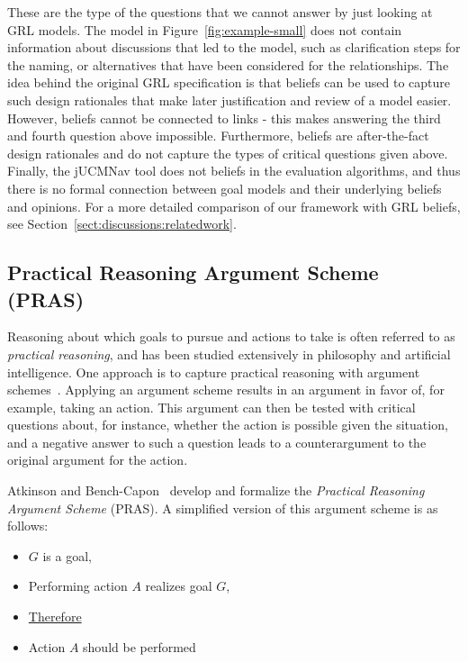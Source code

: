 These are the type of the questions that we cannot answer by just looking at GRL models. The model in Figure~\ref{fig:example-small} does not contain information about discussions that led to the model, such as clarification steps for the naming, or alternatives that have been considered for the relationships. The idea behind the original GRL specification is that beliefs can be used to capture such design rationales that make later justification and review of a model easier. However, beliefs cannot be connected to links - this makes answering the third and fourth question above impossible. Furthermore, beliefs are after-the-fact design rationales and do not capture the types of critical questions given above. Finally, the jUCMNav tool does not beliefs in the evaluation algorithms, and thus there is no formal connection between goal models and their underlying beliefs and opinions. For a more detailed comparison of our framework with GRL beliefs, see Section~\ref{sect:discussions:relatedwork}. 

\subsection{Practical Reasoning Argument Scheme (PRAS)}
\label{sect:background:pras}

Reasoning about which goals to pursue and actions to take is often referred to as \emph{practical reasoning}, and has been studied extensively in philosophy and artificial intelligence. One approach is to capture practical reasoning with argument schemes~\cite{walton1990}. Applying an argument scheme results in an argument in favor of, for example, taking an action. This argument can then be tested with critical questions about, for instance, whether the action is possible given the situation, and a negative answer to such a question leads to a counterargument to the original argument for the action. 

Atkinson and Bench-Capon~\cite{atkinson2007} develop and formalize the \emph{Practical Reasoning Argument Scheme} (PRAS). A simplified version of this argument scheme is as follows:

\begin{itemize}
\item[] $G$ is a goal,
\item[] Performing action $A$ realizes goal $G$,
\item[] \underline{Therefore} 
\item[] Action $A$ should be performed
\end{itemize}

